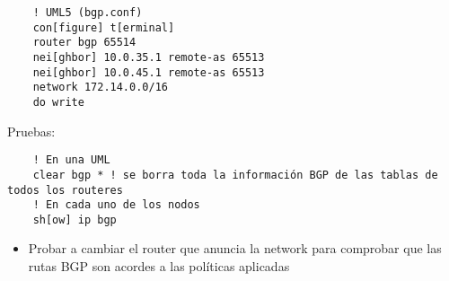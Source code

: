   \begin{verbatim}
    ! UML5 (bgp.conf)
    con[figure] t[erminal]
    router bgp 65514
    nei[ghbor] 10.0.35.1 remote-as 65513
    nei[ghbor] 10.0.45.1 remote-as 65513
    network 172.14.0.0/16
    do write
  \end{verbatim}

  Pruebas:
  \begin{verbatim}
    ! En una UML
    clear bgp * ! se borra toda la información BGP de las tablas de todos los routeres
    ! En cada uno de los nodos
    sh[ow] ip bgp
  \end{verbatim}

  \begin{itemize}
    \item Probar a cambiar el router que anuncia la network para comprobar
    que las rutas BGP son acordes a las políticas aplicadas
  \end{itemize}